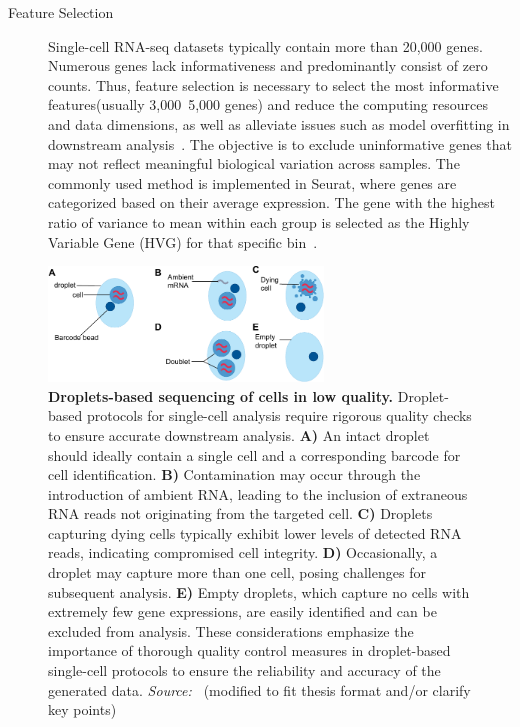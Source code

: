 \begin{description}
	\item[Feature Selection]
	Single-cell RNA-seq datasets typically contain more than 20,000 genes. Numerous genes lack informativeness and predominantly consist of zero counts. Thus, feature selection is necessary to select the most informative features(usually 3,000~5,000 genes) and reduce the computing resources and data dimensions, as well as alleviate issues such as model overfitting in downstream analysis~\citep{yang2021feature}. The objective is to exclude uninformative genes that may not reflect meaningful biological variation across samples. The commonly used method is implemented in Seurat, where genes are categorized based on their average expression. The gene with the highest ratio of variance to mean within each group is selected as the Highly Variable Gene (HVG) for that specific bin~\citep{stuart2019seurat3}.
\end{description}

\begin{figure}[!ht]
	\centering
	\includegraphics[width=0.65\textwidth]{QC_cells/fig}
	\vspace{0.1cm}
	\caption[Droplets-based sequencing of cells in low quality.]{\textbf{Droplets-based sequencing of cells in low quality.} Droplet-based protocols for single-cell analysis require rigorous quality checks to ensure accurate downstream analysis. \textbf{A)} An intact droplet should ideally contain a single cell and a corresponding barcode for cell identification. \textbf{B)} Contamination may occur through the introduction of ambient RNA, leading to the inclusion of extraneous RNA reads not originating from the targeted cell. \textbf{C)} Droplets capturing dying cells typically exhibit lower levels of detected RNA reads, indicating compromised cell integrity. \textbf{D)} Occasionally, a droplet may capture more than one cell, posing challenges for subsequent analysis. \textbf{E)} Empty droplets, which capture no cells with extremely few gene expressions, are easily identified and can be excluded from analysis. These considerations emphasize the importance of thorough quality control measures in droplet-based single-cell protocols to ensure the reliability and accuracy of the generated data. \emph{Source:~\cite{heumos2023best}} (modified to fit thesis format and/or clarify key points)}
	\label{fig:QCcells}
\end{figure}
